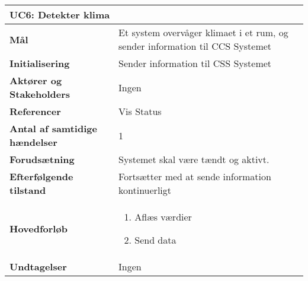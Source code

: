 \begin{table}[H] \centering
\begin{tabular}{|p{6cm}|p{8cm}|}
	\hline
\multicolumn{2}{|l|}{\textbf{UC6: Detekter klima}} \\\hline
\textbf{Mål} &
Et system overvåger klimaet i et rum, og sender information til CCS Systemet  \\\hline

\textbf{Initialisering} &
Sender information til CSS Systemet \\\hline
 
\textbf{Aktører og Stakeholders} &
Ingen \\\hline

\textbf{Referencer} &
Vis Status \\\hline

\textbf{Antal af samtidige hændelser} &
1 \\\hline

\textbf{Forudsætning} &
Systemet skal være tændt og aktivt. \\\hline

\textbf{Efterfølgende tilstand} &
Fortsætter med at sende information kontinuerligt \\\hline

\textbf{Hovedforløb} &
\begin{enumerate}

\item Aflæs værdier
\item Send data
\end{enumerate}   
 \\\hline
 
\textbf{Undtagelser} &Ingen \\\hline
	\end{tabular}
	\label{UC6} 
\end{table}